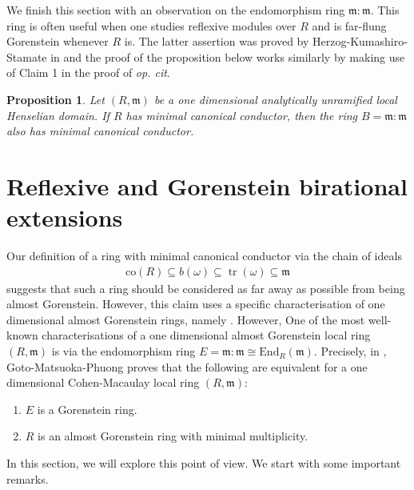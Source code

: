 \documentclass[12pt]{amsart}
\newcommand{\End}{\mathrm{End}}
\newcommand\co{\mathrm{co}}
\newcommand{\m}{\mathfrak{m}}
\newtheorem{proposition}[theorem]{Proposition}
\theoremstyle{definition}
\DeclareMathOperator{\tr}{\mathrm{tr}}
\begin{document}
We finish this section with an observation on the endomorphism ring $\m \colon \m$. This ring is often useful when one studies reflexive modules over $R$ and is far-flung Gorenstein whenever $R$ is. The latter assertion was proved by Herzog-Kumashiro-Stamate in \cite[Theorem 3.3]{Herzog-Kumashiro-Stamate} and the proof of the proposition below works similarly by making use of Claim 1 in the proof of \textit{op. cit}.
\begin{proposition}
    Let $(R, \m)$ be a one dimensional analytically unramified local Henselian domain. If $R$ has minimal canonical conductor, then the ring $B = \m \colon \m$ also has minimal canonical conductor. 
\end{proposition}


\section{Reflexive and Gorenstein birational extensions}
Our definition of a ring with minimal canonical conductor via the chain of ideals 
\begin{align*}
\co(R) \subseteq b(\omega) \subseteq \tr(\omega) \subseteq \m
\end{align*}
suggests that such a ring should be considered as far away as possible from being almost Gorenstein. However, this claim uses a specific characterisation of one dimensional almost Gorenstein rings, namely \cite[Proposition 7.1]{Dao-Maitra-Sridhar}. However, One of the most well-known characterisations of a one dimensional almost Gorenstein local ring $(R,\m)$ is via the endomorphism ring $E=\m \colon \m \cong \End_R(\m)$. Precisely, in \cite[Theorem 5.1]{Goto-Matsuoka-Phuong}, Goto-Matsuoka-Phuong proves that the following are equivalent for a one dimensional Cohen-Macaulay local ring $(R,\m)$:
\begin{enumerate}
    \item $E$ is a Gorenstein ring.
    \item $R$ is an almost Gorenstein ring with minimal multiplicity.
\end{enumerate}
In this section, we will explore this point of view. We start with some important remarks.
\end{document}
